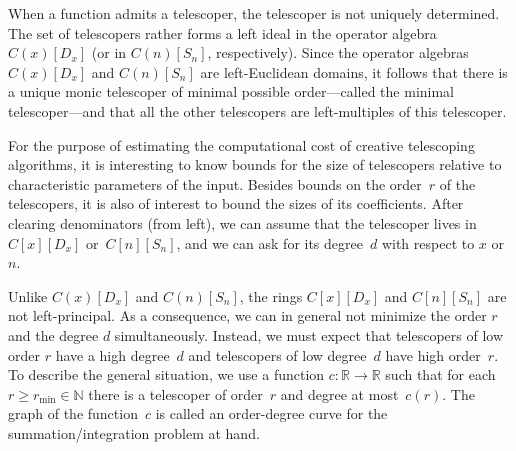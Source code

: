 \documentclass[a4paper,draft]{amsart}
\let\set\mathbb
\begin{document}
 When a function admits a telescoper, the telescoper is not uniquely determined. The set of telescopers
 rather forms a left ideal in the operator algebra $C(x)[D_x]$ (or in $C(n)[S_n]$, respectively).
 Since the operator algebras $C(x)[D_x]$ and $C(n)[S_n]$ are left-Euclidean domains, it follows that
 there is a unique monic telescoper of minimal possible order---called the minimal telescoper---and that
 all the other telescopers are left-multiples of this telescoper.

 For the purpose of estimating the computational cost of creative telescoping algorithms, it is interesting
 to know bounds for the size of telescopers relative to characteristic parameters of the input.
 Besides bounds on the order~$r$ of the telescopers, it is also of interest to bound the sizes of its
 coefficients. After clearing denominators (from left), we can assume that the telescoper lives in
 $C[x][D_x]$ or~$C[n][S_n]$, and we can ask for its degree~$d$ with respect to $x$ or~$n$.

 Unlike $C(x)[D_x]$ and $C(n)[S_n]$, the rings $C[x][D_x]$ and $C[n][S_n]$ are not left-principal. As a
 consequence, we can in general not minimize the order $r$ and the degree $d$ simultaneously. Instead,
 we must expect that telescopers of low order $r$ have a high degree~$d$ and telescopers of low degree~$d$
 have high order~$r$. To describe the general situation, we use a function $c\colon\set R\to\set R$ such
 that for each $r\geq r_{\min}\in\set N$ there is a telescoper of order~$r$ and degree at most~$c(r)$.
 The graph of the function~$c$ is called an order-degree curve for the summation/integration problem at hand.
\end{document}
